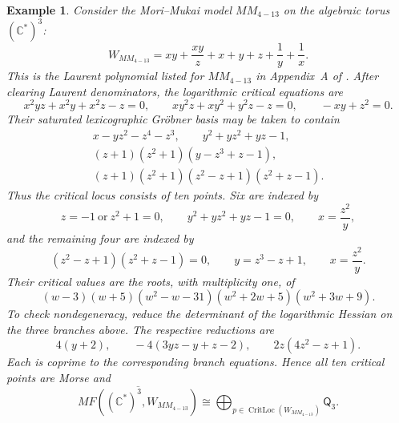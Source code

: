 \documentclass[11pt]{amsart}
\newtheorem{example}{Example}[section]
\DeclareMathOperator{\CritLoc}{CritLoc}
\newcommand{\MorseCat}[1]{\mathsf{Q}_{#1}}
\begin{document}
\begin{example}
Consider the Mori--Mukai model $MM_{4-13}$ on the algebraic torus
$(\mathbb C^*)^3$:
\[
W_{MM_{4-13}}
=xy+\frac{xy}{z}+x+y+z+\frac1y+\frac1x.
\]
This is the Laurent polynomial listed for $MM_{4-13}$ in Appendix~A of
\cite{CoatesCortiGalkinKasprzyk2016}.  After clearing Laurent denominators,
the logarithmic critical equations are
\[
x^2yz+x^2y+x^2z-z=0,\qquad
xy^2z+xy^2+y^2z-z=0,\qquad
-xy+z^2=0.
\]
Their saturated lexicographic Gr\"obner basis may be taken to contain
\[
\begin{gathered}
x-yz^2-z^4-z^3,\qquad y^2+yz^2+yz-1,\\
(z+1)(z^2+1)(y-z^3+z-1),\\
(z+1)(z^2+1)(z^2-z+1)(z^2+z-1).
\end{gathered}
\]
Thus the critical locus consists of ten points. Six are indexed by
\[
z=-1\ \text{or}\ z^2+1=0,\qquad
y^2+yz^2+yz-1=0,\qquad x=\frac{z^2}{y},
\]
and the remaining four are indexed by
\[
(z^2-z+1)(z^2+z-1)=0,\qquad
y=z^3-z+1,\qquad x=\frac{z^2}{y}.
\]
Their critical values are the roots, with multiplicity one, of
\[
(w-3)(w+5)(w^2-w-31)(w^2+2w+5)(w^2+3w+9).
\]
To check nondegeneracy, reduce the determinant of the logarithmic Hessian on
the three branches above. The respective reductions are
\[
4(y+2),\qquad -4(3yz-y+z-2),\qquad 2z(4z^2-z+1).
\]
Each is coprime to the corresponding branch equations. Hence all ten critical
points are Morse and
\[
\overline{MF((\mathbb C^*)^3,W_{MM_{4-13}})}
\cong
\bigoplus_{p\in\CritLoc(W_{MM_{4-13}})}\MorseCat{3}.
\]
\end{example}
\end{document}
